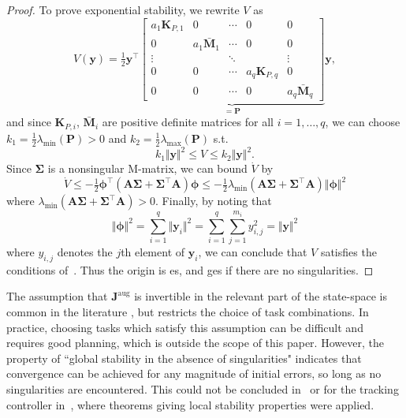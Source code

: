 \documentclass[../main.tex]{subfiles}
\begin{document}
\begin{proof}
    To prove exponential stability, we rewrite $V$ as
    \begin{equation}
        V(\bm{y}) = \tfrac{1}{2} \bm{y}^\top \underbrace{\left[ \begin{smallmatrix}
        a_1 \bm{K}_{P,1} & 0 & \cdots & 0 & 0 \\
        0 & a_1 \bar{\bm{M}}_1 & \cdots & 0 & 0 \\
        \vdots & & \ddots & & \vdots \\
        0 & 0 & \cdots & a_q \bm{K}_{P,q} & 0\\
        0 & 0 & \cdots & 0 & a_q \bar{\bm{M}}_q
        \end{smallmatrix} \right]}_{=\bm{P}} \bm{y} ,
    \end{equation}
    and since $\bm{K}_{P,i}$, $\bar{\bm{M}}_i$ are positive definite matrices for all $i=1,\ldots,q$, we can choose $k_1 = \frac{1}{2} \lambda_{\min}(\bm{P}) > 0$ and $k_2 = \frac{1}{2} \lambda_{\max}(\bm{P})$ s.t.
    \begin{equation}\label{eq:comp:Vbounds}
        k_1 \Vert \bm{y} \Vert^2 \leq V \leq k_2 \Vert \bm{y} \Vert^2 .
    \end{equation}
    Since $\bm{\Sigma}$ is a nonsingular M-matrix, we can bound $\dot{V}$ by
    \begin{equation}
        \dot{V} \leq -\tfrac{1}{2} \bm{\phi}^\top (\bm{A} \bm{\Sigma} + \bm{\Sigma}^\top \bm{A} ) \bm{\phi} \leq - \tfrac{1}{2} \lambda_{\min}(\bm{A} \bm{\Sigma} + \bm{\Sigma}^\top \bm{A}) \Vert \bm{\phi} \Vert^2
    \end{equation}
    where $\lambda_{\min}(\bm{A} \bm{\Sigma} + \bm{\Sigma}^\top \bm{A}) > 0$. Finally, by noting that
    \begin{equation}
        \Vert \bm{\phi} \Vert^2 = \sum_{i=1}^{q} \Vert \bm{y}_i \Vert^2
        = \sum_{i=1}^{q} \sum_{j=1}^{m_i} y_{i,j}^2 = \Vert \bm{y} \Vert^2
    \end{equation}
    where $y_{i,j}$ denotes the $j$th element of $\bm{y}_i$, we can conclude that $V$ satisfies the conditions of~\cite[Theorem 4.10]{Khalil}. Thus the origin is \gls{es}, and \gls{ges} if there are no singularities.
\end{proof}

The assumption that $\bm{J}^{\textrm{aug}}$ is invertible in the relevant part of the state-space is common in the literature \cite{antonelli2009, Dietrich2020, Garofalo2020, Wu2022}, but restricts the choice of task combinations. In practice, choosing tasks which satisfy this assumption can be difficult and requires good planning, which is outside the scope of this paper.
However, the property of ``global stability in the absence of singularities" indicates that convergence can be achieved for any magnitude of initial errors, so long as no singularities are encountered.
This could not be concluded in~\cite{Saeboe2022} or for the tracking controller in~\cite{Dietrich2020}, where theorems giving local stability properties were applied.
\end{document}
